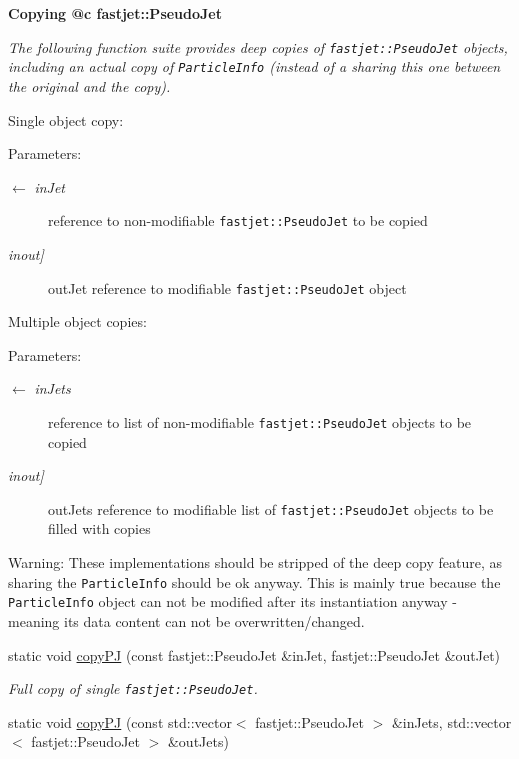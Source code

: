 \begin{Indent}{\bf Copying @c fastjet::Pseudo\-Jet}\par
{\em The following function suite provides deep copies of {\tt fastjet::Pseudo\-Jet} objects, including an actual copy of {\tt Particle\-Info} (instead of a sharing this one between the original and the copy).

Single object copy:

\begin{Desc}
\item[Parameters:]
\begin{description}
\item[\mbox{$\leftarrow$} {\em in\-Jet}]reference to non-modifiable {\tt fastjet::Pseudo\-Jet} to be copied \item[{\em inout\mbox{]}}]out\-Jet reference to modifiable {\tt fastjet::Pseudo\-Jet} object\end{description}
\end{Desc}
Multiple object copies:

\begin{Desc}
\item[Parameters:]
\begin{description}
\item[\mbox{$\leftarrow$} {\em in\-Jets}]reference to list of non-modifiable {\tt fastjet::Pseudo\-Jet} objects to be copied \item[{\em inout\mbox{]}}]out\-Jets reference to modifiable list of {\tt fastjet::Pseudo\-Jet} objects to be filled with copies\end{description}
\end{Desc}
\begin{Desc}
\item[Warning:]These implementations should be stripped of the deep copy feature, as sharing the {\tt Particle\-Info} should be ok anyway. This is mainly true because the {\tt Particle\-Info} object can not be modified after its instantiation anyway - meaning its data content can not be overwritten/changed. \end{Desc}
}\begin{CompactItemize}
\item 
\hypertarget{structUtils_19302c8fa98837d45ea37f5264d80f1e}{
static void \hyperlink{structUtils_19302c8fa98837d45ea37f5264d80f1e}{copy\-PJ} (const fastjet::Pseudo\-Jet \&in\-Jet, fastjet::Pseudo\-Jet \&out\-Jet)}
\label{structUtils_19302c8fa98837d45ea37f5264d80f1e}

\begin{CompactList}\small\item\em Full copy of single {\tt fastjet::Pseudo\-Jet}. \item\end{CompactList}\item 
\hypertarget{structUtils_874fbcbde1849dc6582968f058040106}{
static void \hyperlink{structUtils_874fbcbde1849dc6582968f058040106}{copy\-PJ} (const std::vector$<$ fastjet::Pseudo\-Jet $>$ \&in\-Jets, std::vector$<$ fastjet::Pseudo\-Jet $>$ \&out\-Jets)}
\label{structUtils_874fbcbde1849dc6582968f058040106}


\end{CompactItemize}
\end{Indent}
